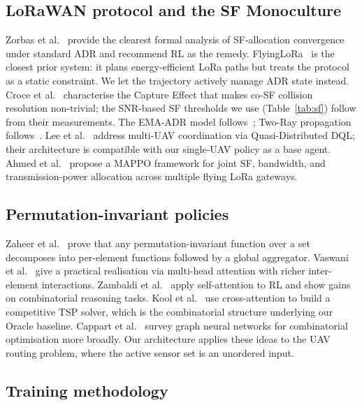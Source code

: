 \documentclass[conference]{IEEEtran}
\begin{document}
\subsection{LoRaWAN protocol and the SF Monoculture}

Zorbas et al.~\cite{zorbas2025revisiting} provide the clearest formal analysis of SF-allocation convergence under standard ADR and recommend RL as the remedy. FlyingLoRa~\cite{xiong2023flyinglora} is the closest prior system: it plans energy-efficient LoRa paths but treats the protocol as a static constraint. We let the trajectory actively manage ADR state instead. Croce et al.~\cite{croce2020lora} characterise the Capture Effect that makes co-SF collision resolution non-trivial; the SNR-based SF thresholds we use (Table~\ref{tab:sf}) follow from their measurements. The EMA-ADR model follows~\cite{slabicki2018adaptive,augustin2016lora}; Two-Ray propagation follows~\cite{rappaport2002wireless,alhourani2014optimal}. Lee et al.~\cite{lee2025quasi} address multi-UAV coordination via Quasi-Distributed DQL; their architecture is compatible with our single-UAV policy as a base agent. Ahmed et al.~\cite{ahmed2026marl} propose a MAPPO framework for joint SF, bandwidth, and transmission-power allocation across multiple flying LoRa gateways.

\subsection{Permutation-invariant policies}

Zaheer et al.~\cite{zaheer2017deepsets} prove that any permutation-invariant function over a set decomposes into per-element functions followed by a global aggregator. Vaswani et al.~\cite{vaswani2017attention} give a practical realisation via multi-head attention with richer inter-element interactions. Zambaldi et al.~\cite{zambaldi2018relational} apply self-attention to RL and show gains on combinatorial reasoning tasks. Kool et al.~\cite{kool2019attention} use cross-attention to build a competitive TSP solver, which is the combinatorial structure underlying our Oracle baseline. Cappart et al.~\cite{cappart2023combinatorial} survey graph neural networks for combinatorial optimisation more broadly. Our architecture applies these ideas to the UAV routing problem, where the active sensor set is an unordered input.

\subsection{Training methodology}
\end{document}
